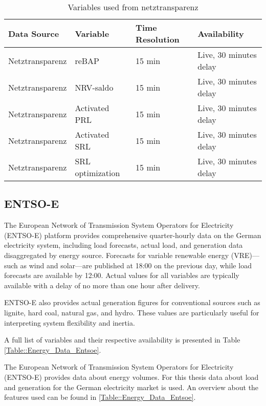 \documentclass[class=scrbook, crop=false]{standalone}
\begin{document}
\begin{table}[]
\centering
\begin{tabular}{l|l|l|l}
 Data Source & Variable &  Time Resolution & Availability  \\\hline
 Netztransparenz & reBAP & 15 min & Live, 30 minutes delay \\
 Netztransparenz & NRV-saldo & 15 min & Live, 30 minutes delay \\
 Netztransparenz & Activated PRL & 15 min &Live, 30 minutes delay \\
 Netztransparenz & Activated SRL & 15 min & Live, 30 minutes delay \\
 Netztransparenz & SRL optimization & 15 min & Live, 30 minutes delay \\

\end{tabular}
\caption{Variables used from netztransparenz}
\label{Table::Energy_Data_Netztransparenz}
\end{table}

\subsection{ENTSO-E}

The European Network of Transmission System Operators for Electricity (ENTSO-E) platform provides comprehensive quarter-hourly data on the German electricity system, including load forecasts, actual load, and generation data disaggregated by energy source. Forecasts for variable renewable energy (VRE)—such as wind and solar—are published at 18:00 on the previous day, while load forecasts are available by 12:00. Actual values for all variables are typically available with a delay of no more than one hour after delivery.

ENTSO-E also provides actual generation figures for conventional sources such as lignite, hard coal, natural gas, and hydro. These values are particularly useful for interpreting system flexibility and inertia.

A full list of variables and their respective availability is presented in Table \ref{Table::Energy_Data_Entsoe}.




The European Network of Transmission System Operators for Electricity (ENTSO-E) provides data about energy volumes.
For this thesis data about load and generation for the German electricity market is used. 
An overview about the features used can be found in \ref{Table::Energy_Data_Entsoe}.
\end{document}
